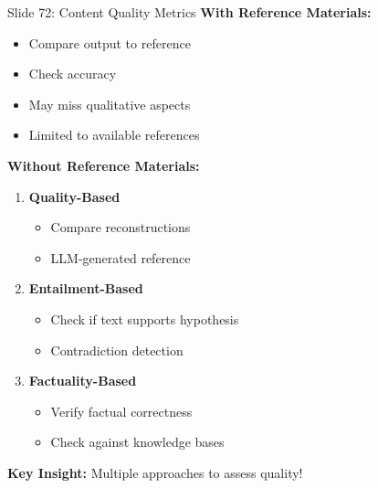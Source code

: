 \documentclass[8pt]{beamer}
\begin{document}
	\begin{frame}{Slide 72: Content Quality Metrics}
		\fontsize{6.5}{7.5}\selectfont
		\textbf{With Reference Materials:}
		\begin{itemize}
			\item Compare output to reference
			\item Check accuracy
			\item May miss qualitative aspects
			\item Limited to available references
		\end{itemize}
		
		\vspace{0.1cm}
		\textbf{Without Reference Materials:}
		\begin{enumerate}
			\item \textbf{Quality-Based}
			\begin{itemize}
				\item Compare reconstructions
				\item LLM-generated reference
			\end{itemize}
			\item \textbf{Entailment-Based}
			\begin{itemize}
				\item Check if text supports hypothesis
				\item Contradiction detection
			\end{itemize}
			\item \textbf{Factuality-Based}
			\begin{itemize}
				\item Verify factual correctness
				\item Check against knowledge bases
			\end{itemize}
		\end{enumerate}
		
		\textcolor{myblue}{\textbf{Key Insight:}} Multiple approaches to assess quality!
	\end{frame}
	
\end{document}
